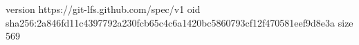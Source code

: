 version https://git-lfs.github.com/spec/v1
oid sha256:2a846fd11c4397792a230fcb65c4c6a1420bc5860793cf12f470581eef9d8e3a
size 569
